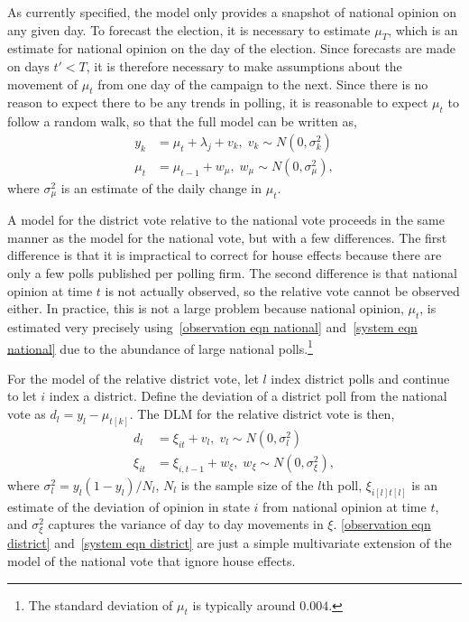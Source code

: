 \documentclass[12pt,final,fleqn]{article}
\theoremstyle{plain}
\begin{document}
As currently specified, the model only provides a snapshot of national opinion on any given day. To forecast the election, it is necessary to estimate $\mu_T$, which is an estimate for national opinion on the day of the election. Since forecasts are made on days $t' <T$, it is therefore necessary to make assumptions about the movement of $\mu_t$ from one day of the campaign to the next. Since there is no reason to expect there to be any trends in polling, it is reasonable to expect $\mu_t$ to follow a random walk, so that the full model can be written as,
\begin{align}
\label{observation eqn national}
y_k &= \mu_{t} + \lambda_{j} + v_k, \; v_k\sim N(0, \sigma^2_k)\\ 
\label{system eqn national}
\mu_{t} &= \mu_{t-1} + w_\mu, \; w_\mu \sim N(0, \sigma^2_{\mu}),
\end{align}
where $\sigma^2_\mu$ is an estimate of the daily change in $\mu_t$.

A model for the district vote relative to the national vote proceeds in the same manner as the model for the national vote, but with a few differences. The first difference is that it is impractical to correct for house effects because there are only a few polls published per polling firm. The second difference is that national opinion at time $t$ is not actually observed, so the relative vote cannot be observed either. In practice, this is not a large problem because national opinion, $\mu_t$, is estimated very precisely using~\autoref{observation eqn national} and~\autoref{system eqn national} due to the abundance of large national polls.\footnote{The standard deviation of $\mu_t$ is typically around $0.004$.}

For the model of the relative district vote, let $l$ index district polls and continue to let $i$ index a district. Define the deviation of a district poll from the national vote as $d_l = y_l - \mu_{t[k]}$. The DLM for the relative district vote is then,
\begin{align}
\label{observation eqn district}
d_l &= \xi_{it} + v_l, \; v_l\sim N(0, \sigma^2_l)\\ 
\label{system eqn district}
\xi_{it} &= \xi_{i,t-1} + w_\xi, \; w_\xi \sim N(0, \sigma^2_{\xi}), 
\end{align}
where $\sigma^2_l = y_l(1-y_l)/N_l$, $N_l$ is the sample size of the $l$th poll, $\xi_{i[l]t[l]}$ is an estimate of the deviation of opinion in state $i$ from national opinion at time $t$, and $\sigma^2_{\xi}$ captures the variance of day to day movements in $\xi$. \autoref{observation eqn district} and~\autoref{system eqn district} are just a simple multivariate extension of the model of the national vote that ignore house effects.
\end{document}

